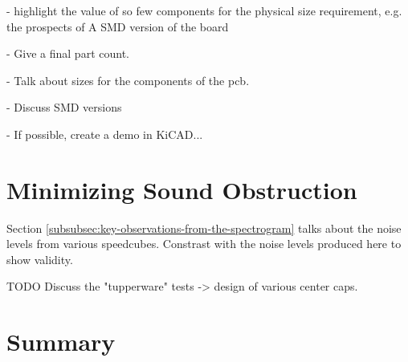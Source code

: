 - highlight the value of so few components for the physical size
requirement, e.g. the prospects of A SMD version of the board

- Give a final part count.

- Talk about sizes for the components of the pcb.

- Discuss SMD versions

- If possible, create a demo in KiCAD...

\section{Minimizing Sound Obstruction}
Section \ref{subsubsec:key-observations-from-the-spectrogram} talks about the noise levels from various speedcubes. Constrast with the noise levels produced here to show validity.

TODO Discuss the "tupperware" tests -> design of various center caps.

\section{Summary}
